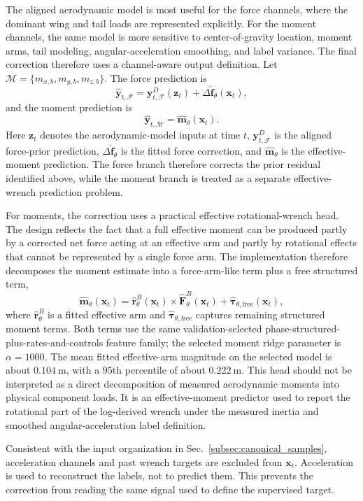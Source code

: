 The aligned aerodynamic model is most useful for the force channels, where the dominant wing and tail loads are represented explicitly. For the moment channels, the same model is more sensitive to center-of-gravity location, moment arms, tail modeling, angular-acceleration smoothing, and label variance. The final correction therefore uses a channel-aware output definition. Let $\mathcal{M}=\{m_{x,b},m_{y,b},m_{z,b}\}$. The force prediction is
\begin{equation}
  \hat{\mathbf{y}}_{t,\mathcal{F}}
  =
  \mathbf{y}^{D}_{t,\mathcal{F}}(\mathbf{z}_t)
  +
  \Delta\hat{\mathbf{f}}_{\theta}(\mathbf{x}_t),
  \label{eq:hybrid_force}
\end{equation}
and the moment prediction is
\begin{equation}
  \hat{\mathbf{y}}_{t,\mathcal{M}}
  =
  \hat{\mathbf{m}}_{\theta}(\mathbf{x}_t).
  \label{eq:hybrid_moment}
\end{equation}
Here $\mathbf{z}_t$ denotes the aerodynamic-model inputs at time $t$, $\mathbf{y}^{D}_{t,\mathcal{F}}$ is the aligned force-prior prediction, $\Delta\hat{\mathbf{f}}_{\theta}$ is the fitted force correction, and $\hat{\mathbf{m}}_{\theta}$ is the effective-moment prediction. The force branch therefore corrects the prior residual identified above, while the moment branch is treated as a separate effective-wrench prediction problem.

For moments, the correction uses a practical effective rotational-wrench head. The design reflects the fact that a full effective moment can be produced partly by a corrected net force acting at an effective arm and partly by rotational effects that cannot be represented by a single force arm. The implementation therefore decomposes the moment estimate into a force-arm-like term plus a free structured term,
\begin{equation}
  \hat{\mathbf{m}}_{\theta}(\mathbf{x}_t)
  =
  \hat{\mathbf{r}}_{\theta}^{B}(\mathbf{x}_t)
  \times
  \hat{\mathbf{F}}_{\theta}^{B}(\mathbf{x}_t)
  +
  \hat{\boldsymbol{\tau}}_{\theta,\mathrm{free}}(\mathbf{x}_t),
  \label{eq:moment_structured_head}
\end{equation}
where $\hat{\mathbf{r}}_{\theta}^{B}$ is a fitted effective arm and $\hat{\boldsymbol{\tau}}_{\theta,\mathrm{free}}$ captures remaining structured moment terms. Both terms use the same validation-selected phase-structured-plus-rates-and-controls feature family; the selected moment ridge parameter is $\alpha=1000$. The mean fitted effective-arm magnitude on the selected model is about $0.104~\mathrm{m}$, with a $95$th percentile of about $0.222~\mathrm{m}$. This head should not be interpreted as a direct decomposition of measured aerodynamic moments into physical component loads. It is an effective-moment predictor used to report the rotational part of the log-derived wrench under the measured inertia and smoothed angular-acceleration label definition.

Consistent with the input organization in Sec.~\ref{subsec:canonical_samples}, acceleration channels and past wrench targets are excluded from $\mathbf{x}_t$. Acceleration is used to reconstruct the labels, not to predict them. This prevents the correction from reading the same signal used to define the supervised target.
